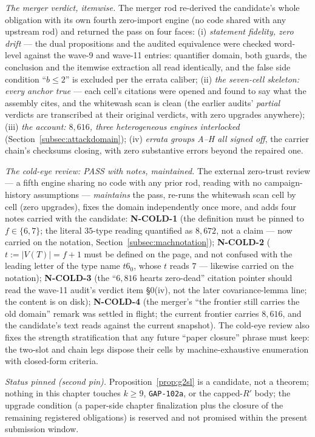 \emph{The merger verdict, itemwise.} The merger rod re-derived the candidate's whole
obligation with its own fourth zero-import engine (no code shared with any upstream rod) and
returned the pass on four faces: (i) \emph{statement fidelity, zero drift} --- the dual
propositions and the audited equivalence were checked word-level against the wave-9 and
wave-11 entries: quantifier domain, both guards, the conclusion and the itemwise extraction
all read identically, and the false side condition ``$b\le2$'' is excluded per the errata
caliber; (ii) \emph{the seven-cell skeleton: every anchor true} --- each cell's citations
were opened and found to say what the assembly cites, and the whitewash scan is clean (the
earlier audits' \emph{partial} verdicts are transcribed at their original verdicts, with
zero upgrades anywhere); (iii) \emph{the account: $8{,}616$, three heterogeneous engines
interlocked} (Section~\ref{subsec:attackdomain}); (iv) \emph{errata groups A--H all signed
off}, the carrier chain's checksums closing, with zero substantive errors beyond the
repaired one.

\emph{The cold-eye review: PASS with notes, maintained.} The external zero-trust review ---
a fifth engine sharing no code with any prior rod, reading with no campaign-history
assumptions --- \emph{maintains} the pass, re-runs the whitewash scan cell by cell (zero
upgrades), fixes the domain independently once more, and adds four notes carried with the
candidate: \textbf{N-COLD-1} (the definition must be pinned to $f\in\{6,7\}$; the literal
$35$-type reading quantified as $8{,}672$, not a claim --- now carried on the notation,
Section~\ref{subsec:machnotation}); \textbf{N-COLD-2} ($t:=|V(T)|=f+1$ must be defined on
the page, and not confused with the leading letter of the type name $t6_0$, whose $t$
reads $7$ --- likewise carried on the notation); \textbf{N-COLD-3} (the ``$6{,}816$ hearts
zero-dead'' citation pointer should read the wave-11 audit's verdict item \S0(iv), not the
later covariance-lemma line; the content is on disk); \textbf{N-COLD-4} (the merger's
``the frontier still carries the old domain'' remark was settled in flight; the current
frontier carries $8{,}616$, and the candidate's text reads against the current snapshot).
The cold-eye review also fixes the strength stratification that any future ``paper
closure'' phrase must keep: the two-slot and chain legs dispose their cells by
machine-exhaustive enumeration with closed-form criteria.

\emph{Status pinned (second pin).} Proposition~\ref{prop:g2sl} is a candidate, not a
theorem; nothing in this chapter touches $k\ge9$, \texttt{GAP-102a}, or the capped-$R'$
body; the upgrade condition (a paper-side chapter finalization plus the closure of the
remaining registered obligations) is reserved and not promised within the present
submission window.

